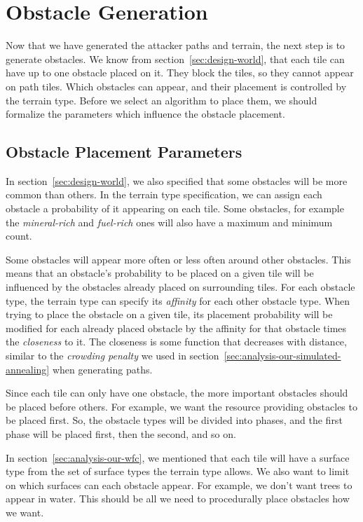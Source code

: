 \section{Obstacle Generation}\label{sec:analysis-obstacles}

Now that we have generated the attacker paths and terrain, the next step is to generate obstacles.
We know from section~\ref{sec:design-world}, that each tile can have up to one obstacle placed on it.
They block the tiles, so they cannot appear on path tiles.
Which obstacles can appear, and their placement is controlled by the terrain type.
Before we select an algorithm to place them, we should formalize the parameters which influence the obstacle placement.

\subsection{Obstacle Placement Parameters}

In section~\ref{sec:design-world}, we also specified that some obstacles will be more common than others.
In the terrain type specification, we can assign each obstacle a probability of it appearing on each tile.
Some obstacles, for example the \emph{mineral-rich} and \emph{fuel-rich} ones will also have a maximum and minimum count.

Some obstacles will appear more often or less often around other obstacles.
This means that an obstacle's probability to be placed on a given tile will be influenced by the obstacles already placed on surrounding tiles.
For each obstacle type, the terrain type can specify its \emph{affinity} for each other obstacle type.
When trying to place the obstacle on a given tile, its placement probability will be modified for each already placed obstacle by the affinity for that obstacle times the \emph{closeness} to it.
The closeness is some function that decreases with distance, similar to the \emph{crowding penalty} we used in section~\ref{sec:analysis-our-simulated-annealing} when generating paths.

Since each tile can only have one obstacle, the more important obstacles should be placed before others.
For example, we want the resource providing obstacles to be placed first.
So, the obstacle types will be divided into phases, and the first phase will be placed first, then the second, and so on.

In section~\ref{sec:analysis-our-wfc}, we mentioned that each tile will have a surface type from the set of surface types the terrain type allows.
We also want to limit on which surfaces can each obstacle appear.
For example, we don't want trees to appear in water.
This should be all we need to procedurally place obstacles how we want.

